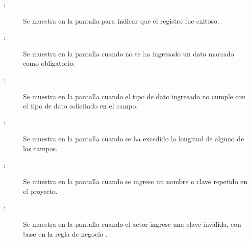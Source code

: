 \begin{description}
	\item[:] Se muestra en la pantalla  para indicar que el registro fue exitoso.
	\item[:] Se muestra en la pantalla  cuando no se ha ingresado un dato marcado como obligatorio.
	\item[:] Se muestra en la pantalla  cuando el tipo de dato ingresado no cumple con el tipo de dato solicitado en el campo.
	\item[:] Se muestra en la pantalla  cuando se ha excedido la longitud de alguno de los campos.
	\item[:] Se muestra en la pantalla  cuando se ingrese un nombre o clave repetido en el proyecto.
	\item[:] Se muestra en la pantalla  cuando el actor ingrese una clave inválida, con base en la regla de negocio .

\end{description}
